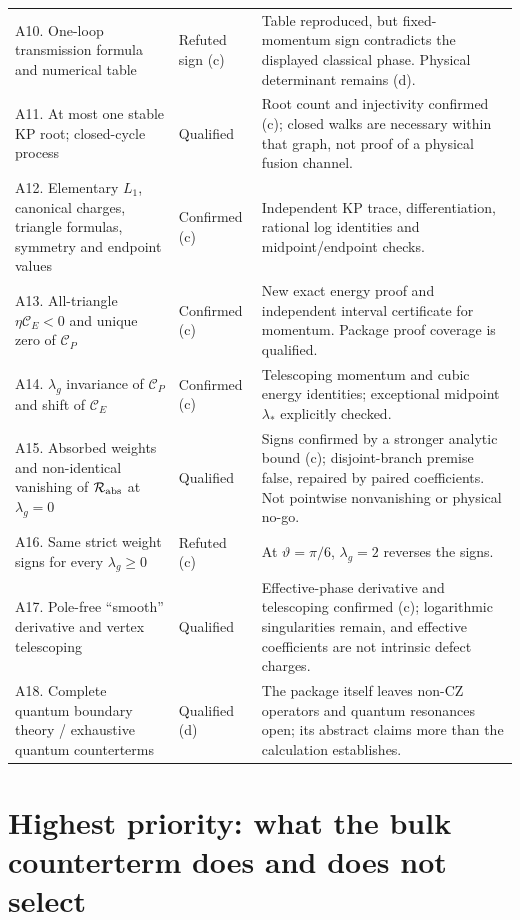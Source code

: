 \documentclass[11pt,a4paper]{article}
\begin{document}
\begin{longtable}{@{}L{6.0cm}L{2.0cm}L{7.3cm}@{}}
A10. One-loop transmission formula and numerical table & Refuted sign (c) & Table reproduced, but fixed-momentum sign contradicts the displayed classical phase. Physical determinant remains (d).\\
A11. At most one stable KP root; closed-cycle process & Qualified & Root count and injectivity confirmed (c); closed walks are necessary within that graph, not proof of a physical fusion channel.\\
A12. Elementary $L_1$, canonical charges, triangle formulas, symmetry and endpoint values & Confirmed (c) & Independent KP trace, differentiation, rational log identities and midpoint/endpoint checks.\\
A13. All-triangle $\eta\mathcal C_E<0$ and unique zero of $\mathcal C_P$ & Confirmed (c) & New exact energy proof and independent interval certificate for momentum. Package proof coverage is qualified.\\
A14. $\lambda_g$ invariance of $\mathcal C_P$ and shift of $\mathcal C_E$ & Confirmed (c) & Telescoping momentum and cubic energy identities; exceptional midpoint $\lambda_*$ explicitly checked.\\
A15. Absorbed weights and non-identical vanishing of $\mathcal R_{\rm abs}$ at $\lambda_g=0$ & Qualified & Signs confirmed by a stronger analytic bound (c); disjoint-branch premise false, repaired by paired coefficients. Not pointwise nonvanishing or physical no-go.\\
A16. Same strict weight signs for every $\lambda_g\ge0$ & Refuted (c) & At $\vartheta=\pi/6$, $\lambda_g=2$ reverses the signs.\\
A17. Pole-free ``smooth'' derivative and vertex telescoping & Qualified & Effective-phase derivative and telescoping confirmed (c); logarithmic singularities remain, and effective coefficients are not intrinsic defect charges.\\
A18. Complete quantum boundary theory / exhaustive quantum counterterms & Qualified (d) & The package itself leaves non-CZ operators and quantum resonances open; its abstract claims more than the calculation establishes.\\\bottomrule
\end{longtable}

\section{Highest priority: what the bulk counterterm does and does not select}
\end{document}
